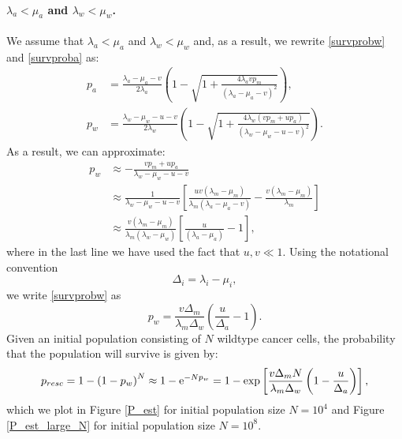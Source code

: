 \documentclass[12pt]{extarticle}
\newcommand{\e}{{\rm e}}
\begin{document}
\paragraph{$\lambda_a<\mu_a$ and $\lambda_w<\mu_w$.}
We assume that $\lambda_a<\mu_a$ and $\lambda_w<\mu_w$ and, as a result, we rewrite \eqref{survprobw} and \eqref{survproba} as:
\begin{align*}
p_a&=\frac{\lambda_a-\mu_a-v}{2\lambda_a}\left(1-\sqrt{1+\frac{4\lambda_avp_m}{\left(\lambda_a-\mu_a-v\right)^2}}\right),\\
p_w&=\frac{\lambda_w-\mu_w-u-v}{2\lambda_w}\left(1-\sqrt{1+\frac{4\lambda_w\left(vp_m+up_a\right)}{\left(\lambda_w-\mu_w-u-v\right)^2}}\right).
\end{align*}
As a result, we can approximate:
\begin{align}\label{survprobwinitial}
p_w&\approx-\frac{vp_m+up_a}{\lambda_w-\mu_w-u-v}\\
\nonumber
&\approx\frac{1}{\lambda_w-\mu_w-u-v}\left[\frac{uv\left(\lambda_m-\mu_m\right)}{\lambda_m\left(\lambda_a-\mu_a-v\right)}-\frac{v\left(\lambda_m-\mu_m\right)}{\lambda_m}\right]\\ \label{survprobw2}
&\approx\frac{v\left(\lambda_m-\mu_m\right)}{\lambda_m\left(\lambda_w-\mu_w\right)}\left[\frac{u}{\left(\lambda_a-\mu_a\right)}-1\right],
\end{align}
where in the last line we have used the fact that $u,v\ll1$. Using the notational convention
\begin{equation}\label{notationalconv}
\Delta_i=\lambda_i-\mu_i,
\end{equation}
we write \eqref{survprobw} as
\begin{equation}\label{survprobwapprox2}
p_w=\frac{v\Delta_m}{\lambda_m\Delta_w}\left(\frac{u}{\Delta_a}-1\right).
\end{equation}
Given an initial population consisting of $N$ wildtype cancer cells, the probability that the population will survive is given by: 
\begin{align}\label{AneuploidyDeleteriousApprox}
p_{resc}=1-\left(1-p_w\right)^N\approx 1-\e^{-Np_w}=1-\exp\left[\frac{v\Delta_mN}{\lambda_m\Delta_w}\left(1-\frac{u}{\Delta_a}\right)\right],
\end{align}
which we plot in Figure \ref{P_est} for initial population size $N=10^4$ and Figure \ref{P_est_large_N} for initial population size $N=10^8$.
\end{document}
